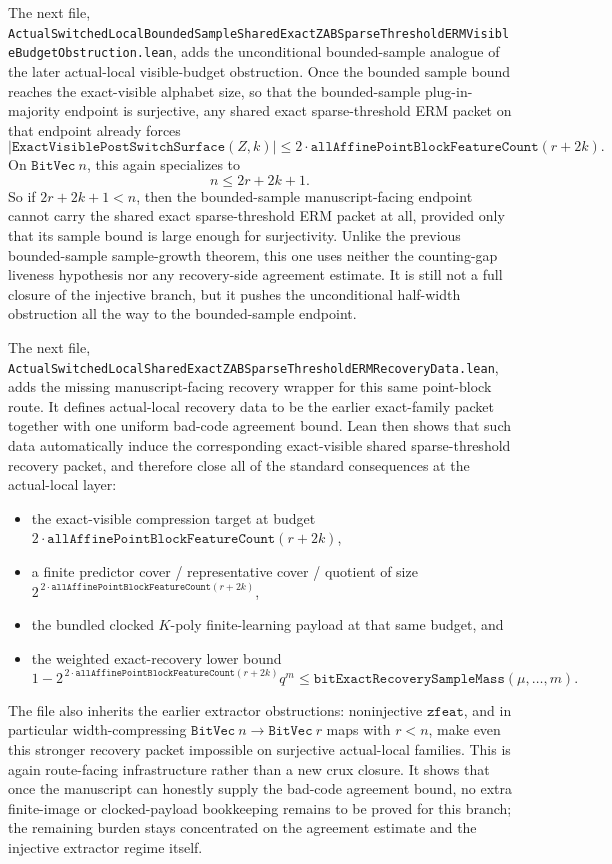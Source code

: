 \documentclass[11pt]{article}
\theoremstyle{remark}
\begin{document}
The next file,
\texttt{ActualSwitchedLocalBoundedSampleSharedExactZABSparseThresholdERMVisibleBudgetObstruction.lean},
adds the unconditional bounded-sample analogue of the later actual-local
visible-budget obstruction.  Once the bounded sample bound reaches the
exact-visible alphabet size, so that the bounded-sample plug-in-majority
endpoint is surjective, any shared exact sparse-threshold ERM packet on that
endpoint already forces
\[
  \left|\texttt{ExactVisiblePostSwitchSurface}(Z,k)\right|
  \le
  2 \cdot \texttt{allAffinePointBlockFeatureCount}(r+2k).
\]
On \(\texttt{BitVec}\ n\), this again specializes to
\[
  n \le 2r + 2k + 1.
\]
So if \(2r + 2k + 1 < n\), then the bounded-sample manuscript-facing endpoint
cannot carry the shared exact sparse-threshold ERM packet at all, provided only
that its sample bound is large enough for surjectivity.  Unlike the previous
bounded-sample sample-growth theorem, this one uses neither the counting-gap
liveness hypothesis nor any recovery-side agreement estimate.  It is still not
a full closure of the injective branch, but it pushes the unconditional
half-width obstruction all the way to the bounded-sample endpoint.

The next file,
\texttt{ActualSwitchedLocalSharedExactZABSparseThresholdERMRecoveryData.lean},
adds the missing manuscript-facing recovery wrapper for this same point-block
route.  It defines actual-local recovery data to be the earlier exact-family
packet together with one uniform bad-code agreement bound.  Lean then shows that
such data automatically induce the corresponding exact-visible shared
sparse-threshold recovery packet, and therefore close all of the standard
consequences at the actual-local layer:
\begin{itemize}
  \item the exact-visible compression target at budget
  \(2 \cdot \texttt{allAffinePointBlockFeatureCount}(r+2k)\),
  \item a finite predictor cover / representative cover / quotient of size
  \(2^{\,2 \cdot \texttt{allAffinePointBlockFeatureCount}(r+2k)}\),
  \item the bundled clocked \(K\)-poly finite-learning payload at that same
  budget, and
  \item the weighted exact-recovery lower bound
  \[
    1 - 2^{\,2 \cdot \texttt{allAffinePointBlockFeatureCount}(r+2k)} q^m
    \le \texttt{bitExactRecoverySampleMass}(\mu,\dots,m).
  \]
\end{itemize}
The file also inherits the earlier extractor obstructions: noninjective
\(\texttt{zfeat}\), and in particular width-compressing
\(\texttt{BitVec}\ n \to \texttt{BitVec}\ r\) maps with \(r<n\), make even this
stronger recovery packet impossible on surjective actual-local families.  This
is again route-facing infrastructure rather than a new crux closure.  It shows
that once the manuscript can honestly supply the bad-code agreement bound, no
extra finite-image or clocked-payload bookkeeping remains to be proved for this
branch; the remaining burden stays concentrated on the agreement estimate and
the injective extractor regime itself.
\end{document}
